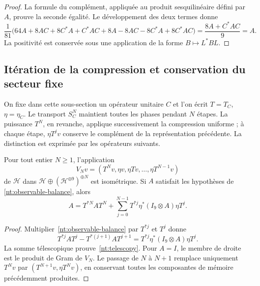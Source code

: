\begin{proof}
La formule du complément, appliquée au produit sesquilinéaire
défini par \(A\), prouve la seconde égalité. Le développement des
deux termes donne
\[
 \frac1{81}\bigl(
 64A+8AC+8C^*A+C^*AC
 +8A-8AC-8C^*A+8C^*AC\bigr)
 =\frac{8A+C^*AC}{9}=A.
\]
La positivité est conservée sous une application de la forme \(B\mapsto L^*BL\).
\end{proof}

\subsection{Itération de la compression et conservation du secteur fixe}

On fixe dans cette sous-section un opérateur unitaire \(C\) et l'on écrit \(T=T_C\), \(\eta=\eta_C\). Le transport \(S_C^N\) maintient toutes les phases pendant \(N\) étapes. La puissance \(T^N\), en revanche, applique successivement la compression uniforme ; à chaque étape, \(\eta T^jv\) conserve le complément de la représentation précédente. La distinction est exprimée par les opérateurs suivants.

\begin{proposition}
Pour tout entier \(N\geq1\), l’application
\begin{equation}
 V_Nv=(T^Nv,\eta v,\eta Tv,\ldots,\eta T^{N-1}v)
 \label{nt:finite-record}
\end{equation}
de \(\mathcal H\) dans
\(\mathcal H\oplus(\mathcal H^{\oplus9})^{\oplus N}\)
est isométrique. Si \(A\) satisfait les hypothèses de
\eqref{nt:observable-balance}, alors
\begin{equation}
 A=T^{*N}AT^N+
 \sum_{j=0}^{N-1}T^{*j}\eta^*(I_9\otimes A)\eta T^j.
 \label{nt:telescopy}
\end{equation}
\end{proposition}

\begin{proof}
Multiplier~\eqref{nt:observable-balance} par \(T^{*j}\) et
\(T^j\) donne
\[
 T^{*j}AT^j-T^{*(j+1)}AT^{j+1}
 =T^{*j}\eta^*(I_9\otimes A)\eta T^j.
\]
La somme télescopique prouve~\eqref{nt:telescopy}. Pour \(A=I\),
le membre de droite est le produit de Gram de \(V_N\).
Le passage de \(N\) à \(N+1\) remplace uniquement \(T^Nv\) par
\((T^{N+1}v,\eta T^Nv)\), en conservant toutes les composantes
de mémoire précédemment produites.
\end{proof}

